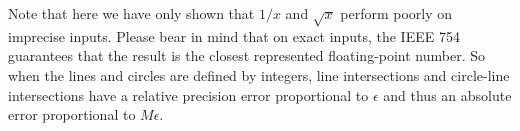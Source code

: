 
Note that here we have only shown that $1/x$ and $\sqrt{x}$ perform poorly on imprecise inputs. Please bear in mind that on exact inputs, the IEEE 754 guarantees that the result is the closest represented floating-point number. So when the lines and circles are defined by integers, line intersections and circle-line intersections have a relative precision error proportional to $\epsilon$ and thus an absolute error proportional to $M\epsilon$.
